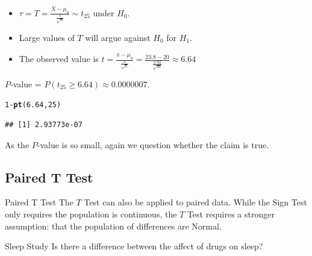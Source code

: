 \documentclass[t,xcolor=pdftex,dvipsnames,table]{beamer}
\makeatletter
\newcommand{\hlnum}[1]{\textcolor[rgb]{0.686,0.059,0.569}{#1}}%
\newcommand{\hlopt}[1]{\textcolor[rgb]{0,0,0}{#1}}%
\newcommand{\hlstd}[1]{\textcolor[rgb]{0.345,0.345,0.345}{#1}}%
\newcommand{\hlkwd}[1]{\textcolor[rgb]{0.737,0.353,0.396}{\textbf{#1}}}%
\newenvironment{kframe}{%
 \def\at@end@of@kframe{}%
 \ifinner\ifhmode%
  \def\at@end@of@kframe{\end{minipage}}%
  \begin{minipage}{\columnwidth}%
 \fi\fi%
 \def\FrameCommand##1{\hskip\@totalleftmargin \hskip-\fboxsep
 \colorbox{shadecolor}{##1}\hskip-\fboxsep
     \hskip-\linewidth \hskip-\@totalleftmargin \hskip\columnwidth}%
 \MakeFramed {\advance\hsize-\width
   \@totalleftmargin\z@ \linewidth\hsize
   \@setminipage}}%
 {\par\unskip\endMakeFramed%
 \at@end@of@kframe}
\newenvironment{knitrout}{}{} %
\makeatother
\begin{document}
\begin{frame}[fragile]{}

\begin{itemize}
\item $\tau = T = \frac{\bar{X} - \mu_{0}}{\frac{s}{\sqrt{n}}}  \sim t_{25}$ under $H_{0}$. 
\item Large values of $T$ will argue against $H_{0}$ for $H_{1}$. 
\item The observed value is $t=  \frac{\bar{x} - \mu_{0}}{\frac{s}{\sqrt{n}}} = \frac{23.8 - 20}{\frac{2.92}{\sqrt{26}}} \approx 6.64$
\end{itemize}

 $P$-value = $P( t_{25} \geq 6.64) \approx  0.0000007$.

\begin{knitrout}
\color{fgcolor}\begin{kframe}
\begin{alltt}
\hlnum{1}\hlopt{-}\hlkwd{pt}\hlstd{(}\hlnum{6.64}\hlstd{,}\hlnum{25}\hlstd{)}
\end{alltt}
\begin{verbatim}
## [1] 2.93773e-07
\end{verbatim}
\end{kframe}
\end{knitrout}

\vspace{.5cm}
 As the $P$-value is so small, again we question whether the claim is true.

\end{frame} 


\subsection[Paired T Test]{Paired T Test}
\begin{frame}[fragile]{Paired T Test}
The $T$ Test can also be applied to paired data. While the Sign Test only requires the population is continuous, the $T$ Test requires a stronger assumption: that the population of differences are Normal.

\vspace{.5cm}
\begin{block}{Sleep Study}
Is there a difference between the affect of drugs on sleep?
\end{block}
\end{frame}
\end{document}
